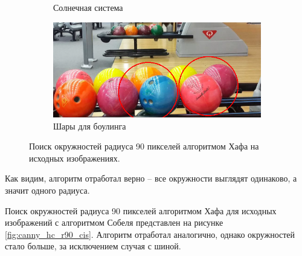 \documentclass[a4paper, 16pt]{article}
\begin{document}
\begin{figure}[htbp]
\begin{subfigure}{0.3\textwidth}
            \caption{Солнечная система}
            \label{fig:hc_r90_ci2}
        \end{subfigure}
        \hfill
        \begin{subfigure}{0.3\textwidth}
            \centering
            \includegraphics[width=\linewidth]{hc_r=90_ci3.png}
            \caption{Шары для боулинга}
            \label{fig:hc_r90_ci3}
        \end{subfigure}
        \caption{Поиск окружностей радиуса 90 пикселей алгоритмом Хафа на исходных изображениях.}
        \label{fig:hc_r90_cis}
    \end{figure}


    \noindent Как видим, алгоритм отработал верно -- все окружности выглядят одинаково, а значит одного радиуса.


    \noindent Поиск окружностей радиуса 90 пикселей алгоритмом Хафа для исходных изображений с алгоритмом Собеля представлен на рисунке \ref{fig:canny_hc_r90_cis}.
    Алгоритм отработал аналогично, однако окружностей стало больше, за исключением случая с шиной.
\end{document}
